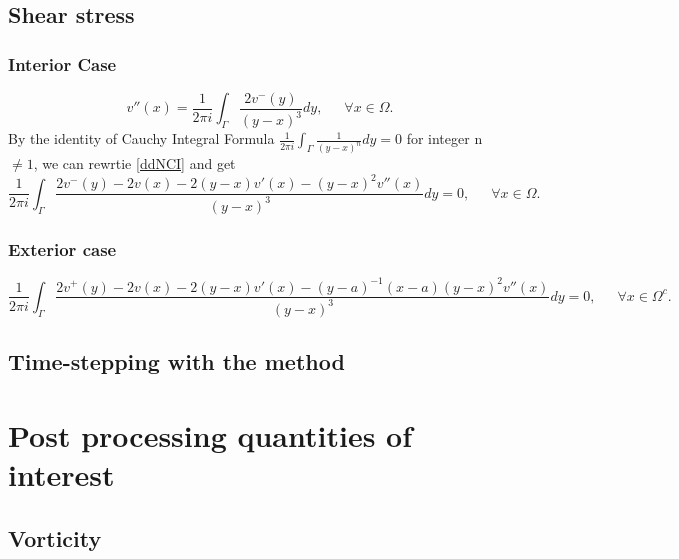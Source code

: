 \documentclass[preprint, 10pt]{elsarticle}
\begin{document}
\subsection{Shear stress}
\label{sec:shearStress}
\subsubsection{Interior Case}
\begin{equation}\label{ddNCI}
v''({x})=\frac{1}{2\pi i}\int_{\Gamma}\frac{2v^-({ y})}{(y- x)^3} d{ y},\,\,\,\,\,\,\,\,\, \forall { x} \in \Omega.
\end{equation}
By the identity of Cauchy Integral Formula $\displaystyle\frac{1}{2 \pi i}\int_{\Gamma}\frac{1}{( y- x)^n} d{ y}=0$ for integer n $\neq 1$, we can rewrtie \eqref{ddNCI} and get 
\begin{equation}
\frac{1}{2\pi i}\int_{\Gamma}\frac{2v^-({ y})-2v(x)-2(y-x)v'(x)-(y-x)^2v''(x)}{(y-x)^3} d{ y}=0,\,\,\,\,\,\,\,\,\, \forall { x} \in \Omega.
\end{equation}
\subsubsection{Exterior case}
\begin{equation}
\frac{1}{2\pi i}\int_{\Gamma}\frac{2v^+({ y})-2v(x)-2(y-x)v'(x)-(y-a)^{-1}(x-a)(y-x)^2v''(x)}{(y-x)^3} d{ y}=0,\,\,\,\,\,\,\,\,\, \forall { x} \in \Omega^c.
\end{equation}
\subsection{Time-stepping with the {\thL} method} 
\label{sec:timeStepping}


\section{Post processing quantities of interest}
\label{s:qoi}

\subsection{Vorticity}
\end{document}
